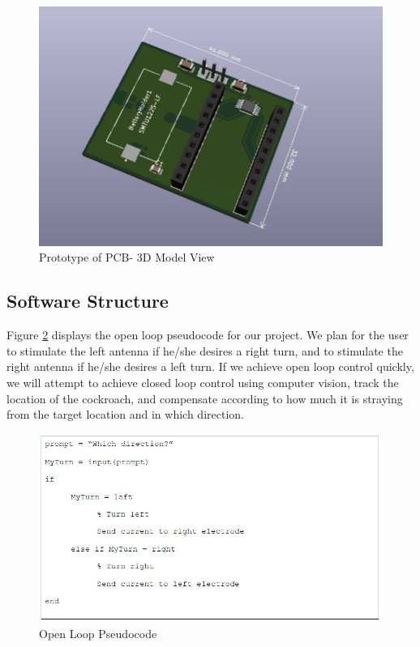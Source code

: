 \documentclass{article}
\begin{document}
\begin{figure}[ht!]
\centering
\includegraphics[scale=0.5]{my3dmodel.JPG}
\caption{Prototype of PCB- 3D Model View}
\label{fig:3d}
\end{figure}


\subsection{Software Structure}
\par Figure \ref{fig:pseudocode} displays the open loop pseudocode for our project. We plan for the user to stimulate the left antenna if he/she desires a right turn, and to stimulate the right antenna if he/she desires a left turn. If we achieve open loop control quickly, we will attempt to achieve closed loop control using computer vision, track the location of the cockroach, and compensate according to how much it is straying from the target location and in which direction.

\begin{figure}[ht!]
\centering
\includegraphics[scale=0.4]{pseudocode.JPG}
\caption{Open Loop Pseudocode}
\label{fig:pseudocode}
\end{figure}
\end{document}
